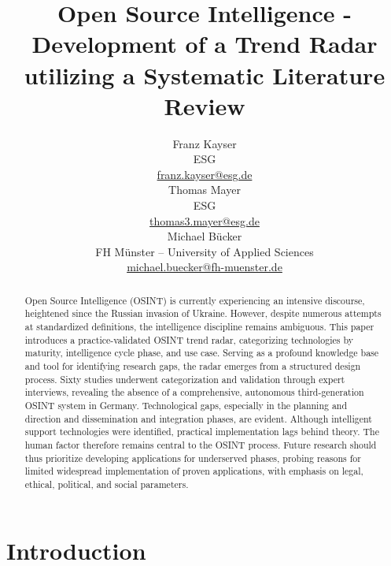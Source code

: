 \documentclass[10pt]{article}
\title{Open Source Intelligence - Development of a Trend Radar utilizing a Systematic Literature Review}
\author{Franz Kayser \\
  ESG \\
  {\underline{ franz.kayser@esg.de}} \\\And
  Thomas Mayer \\
  ESG  \\
  {\underline{ thomas3.mayer@esg.de} }\\\And 
  Michael Bücker \\
  FH Münster -- University of Applied Sciences\\
  {\underline{michael.buecker@fh-muenster.de}} \\}
\date{}
\begin{document}
\maketitle
\begin{abstract}
    Open Source Intelligence (OSINT) is currently experiencing an intensive discourse,
    heightened since the Russian invasion of Ukraine. However, despite numerous attempts
    at standardized definitions, the intelligence discipline remains ambiguous. This paper
    introduces a practice-validated OSINT trend radar, categorizing technologies by maturity,
    intelligence cycle phase, and use case. Serving as a profound knowledge base and tool for
    identifying research gaps, the radar emerges from a structured design process. Sixty
    studies underwent categorization and validation through expert interviews,
    revealing the absence of a comprehensive, autonomous third-generation OSINT
    system in Germany. Technological gaps, especially in the planning and direction and
    dissemination and integration phases, are evident. Although intelligent support
    technologies were identified, practical implementation lags behind theory. The human
    factor therefore remains central to the OSINT process. Future research should thus
    prioritize developing applications for underserved phases, probing reasons for limited
    widespread implementation of proven applications, with emphasis on legal, ethical,
    political, and social parameters.
\end{abstract}

\section{Introduction} \label{sec:introduction}
\end{document}
